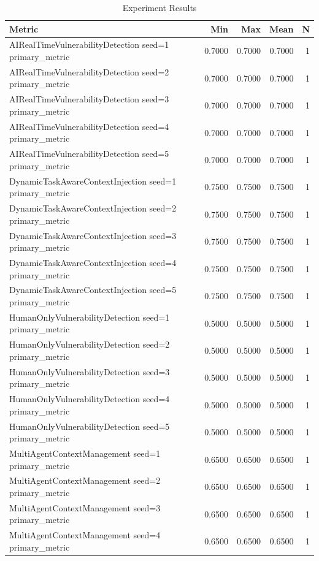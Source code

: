\begin{table}[h]
\centering
\caption{Experiment Results}
\begin{tabular}{lrrrr}
\hline
Metric & Min & Max & Mean & N \\
\hline
AIRealTimeVulnerabilityDetection seed=1 primary_metric & 0.7000 & 0.7000 & 0.7000 & 1 \\
AIRealTimeVulnerabilityDetection seed=2 primary_metric & 0.7000 & 0.7000 & 0.7000 & 1 \\
AIRealTimeVulnerabilityDetection seed=3 primary_metric & 0.7000 & 0.7000 & 0.7000 & 1 \\
AIRealTimeVulnerabilityDetection seed=4 primary_metric & 0.7000 & 0.7000 & 0.7000 & 1 \\
AIRealTimeVulnerabilityDetection seed=5 primary_metric & 0.7000 & 0.7000 & 0.7000 & 1 \\
DynamicTaskAwareContextInjection seed=1 primary_metric & 0.7500 & 0.7500 & 0.7500 & 1 \\
DynamicTaskAwareContextInjection seed=2 primary_metric & 0.7500 & 0.7500 & 0.7500 & 1 \\
DynamicTaskAwareContextInjection seed=3 primary_metric & 0.7500 & 0.7500 & 0.7500 & 1 \\
DynamicTaskAwareContextInjection seed=4 primary_metric & 0.7500 & 0.7500 & 0.7500 & 1 \\
DynamicTaskAwareContextInjection seed=5 primary_metric & 0.7500 & 0.7500 & 0.7500 & 1 \\
HumanOnlyVulnerabilityDetection seed=1 primary_metric & 0.5000 & 0.5000 & 0.5000 & 1 \\
HumanOnlyVulnerabilityDetection seed=2 primary_metric & 0.5000 & 0.5000 & 0.5000 & 1 \\
HumanOnlyVulnerabilityDetection seed=3 primary_metric & 0.5000 & 0.5000 & 0.5000 & 1 \\
HumanOnlyVulnerabilityDetection seed=4 primary_metric & 0.5000 & 0.5000 & 0.5000 & 1 \\
HumanOnlyVulnerabilityDetection seed=5 primary_metric & 0.5000 & 0.5000 & 0.5000 & 1 \\
MultiAgentContextManagement seed=1 primary_metric & 0.6500 & 0.6500 & 0.6500 & 1 \\
MultiAgentContextManagement seed=2 primary_metric & 0.6500 & 0.6500 & 0.6500 & 1 \\
MultiAgentContextManagement seed=3 primary_metric & 0.6500 & 0.6500 & 0.6500 & 1 \\
MultiAgentContextManagement seed=4 primary_metric & 0.6500 & 0.6500 & 0.6500 & 1 \\

\end{tabular}
\end{table}
